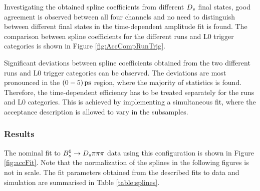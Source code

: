 Investigating the obtained spline coefficients from different ${{D}_{s}}$ final states, 
good agreement is observed between all four channels and no need to distinguish between different final states in the time-dependent amplitude fit is found. \newline
The comparison between spline coefficients for the different runs and L0 trigger categories is shown in Figure \ref{fig:AccCompRunTrig}.

Significant deviations between spline coefficients obtained from the two different runs and L0 trigger categories can be observed. 
The deviations are most pronounced in the $(0-5) {\mathrm{ \,ps}}$ region, where the majority of statistics is found. 
Therefore, the time-dependent efficiency has to be treated separately for the runs and L0 categories. 
This is achieved by implementing a simultaneous fit, where the acceptance description is allowed to vary in the subsamples.   



\clearpage
\subsubsection{Results}

The nominal fit to ${{B}^0_{s}}\rightarrow{\ensuremath{{D}_{s}}}{\ensuremath{\pi}}{\ensuremath{\pi}}{\ensuremath{\pi}}$ data using this configuration is shown in Figure \ref{fig:accFit}. 
Note that the normalization of the splines in the following figures is not in scale.
The fit parameters obtained from the described fits to data and simulation are summarised in Table \ref{table:splines}.
%
%

\clearpage





